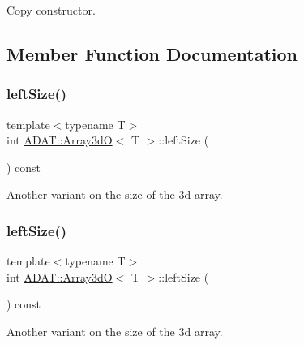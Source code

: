 Copy constructor. 



\subsection{Member Function Documentation}
\mbox{\label{classADAT_1_1Array3dO_a60f0fb62e8b93e6828fc98df271db054}} 
\subsubsection{\texorpdfstring{leftSize()}{leftSize()}\hspace{0.1cm}{\footnotesize\ttfamily [1/3]}}
{\footnotesize\ttfamily template$<$typename T$>$ \\
int \mbox{\hyperlink{classADAT_1_1Array3dO}{A\+D\+A\+T\+::\+Array3dO}}$<$ T $>$\+::left\+Size (\begin{DoxyParamCaption}{ }\end{DoxyParamCaption}) const\hspace{0.3cm}{\ttfamily [inline]}}



Another variant on the size of the 3d array. 

\mbox{\label{classADAT_1_1Array3dO_a60f0fb62e8b93e6828fc98df271db054}} 
\subsubsection{\texorpdfstring{leftSize()}{leftSize()}\hspace{0.1cm}{\footnotesize\ttfamily [2/3]}}
{\footnotesize\ttfamily template$<$typename T$>$ \\
int \mbox{\hyperlink{classADAT_1_1Array3dO}{A\+D\+A\+T\+::\+Array3dO}}$<$ T $>$\+::left\+Size (\begin{DoxyParamCaption}{ }\end{DoxyParamCaption}) const\hspace{0.3cm}{\ttfamily [inline]}}



Another variant on the size of the 3d array. 

